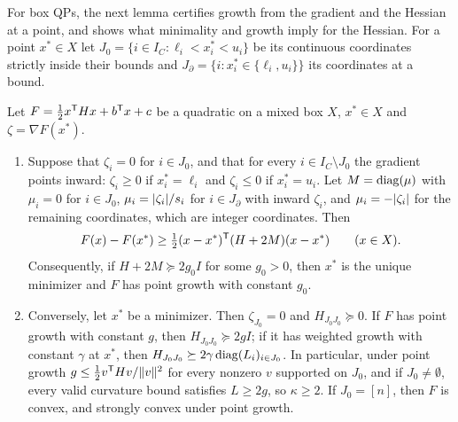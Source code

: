 
For box QPs, the next lemma certifies growth from the gradient and the
Hessian at a point, and shows what minimality and growth imply for the
Hessian. For a point $x^*\in X$ let
$J_0=\{i\in I_C:\ell_i<x^*_i<u_i\}$ be its continuous coordinates strictly
inside their bounds and $J_\partial=\{i:x^*_i\in\{\ell_i,u_i\}\}$ its
coordinates at a bound.

\begin{lemma}\label{lem:growthcert}
Let $F=\frac12x^\mathsf T Hx+b^\mathsf T x+c$ be a quadratic on a mixed box $X$, $x^*\in X$
and $\zeta=\nabla F(x^*)$.
\begin{enumerate}
\item[(a)] Suppose that $\zeta_i=0$ for $i\in J_0$, and that for every
$i\in I_C\setminus J_0$ the gradient points inward: $\zeta_i\ge0$ if
$x^*_i=\ell_i$ and $\zeta_i\le0$ if $x^*_i=u_i$. Let $M=\operatorname{diag}(\mu)$ with
$\mu_i=0$ for $i\in J_0$, $\mu_i=\lvert \zeta_i\rvert/s_i$ for $i\in J_\partial$
with inward $\zeta_i$, and $\mu_i=-\lvert \zeta_i\rvert$ for the remaining
coordinates, which are integer coordinates. Then
\begin{equation}\label{eq:minorant}
F(x)-F(x^*)\ge\tfrac12(x-x^*)^{\mathsf T}(H+2M)(x-x^*)\qquad(x\in X).
\end{equation}
Consequently, if $H+2M\succeq2g_0I$ for some $g_0>0$, then $x^*$ is the unique
minimizer and $F$ has point growth with constant $g_0$.
\item[(b)] Conversely, let $x^*$ be a minimizer. Then $\zeta_{J_0}=0$ and
$H_{J_0J_0}\succeq0$. If $F$ has point growth with constant $g$, then
$H_{J_0J_0}\succeq2gI$; if it has weighted growth with constant $\gamma$ at
$x^*$, then $H_{J_0J_0}\succeq2\gamma\operatorname{diag}(L_i)_{i\in J_0}$. In particular,
under point growth $g\le\frac12v^{\mathsf T}Hv/\lVert v\rVert^2$ for every nonzero $v$
supported on $J_0$, and if $J_0\ne\emptyset$, every valid curvature bound
satisfies $L\ge2g$, so $\kappa\ge2$. If $J_0=[n]$, then $F$ is convex, and
strongly convex under point growth.
\end{enumerate}
\end{lemma}

